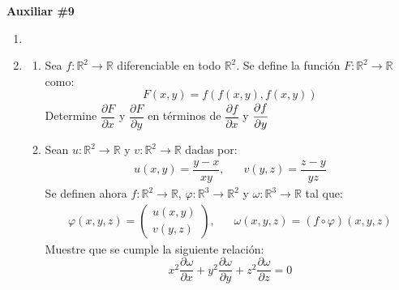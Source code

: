 \documentclass[letterpaper,11pt]{article}
\begin{document}
\begin{center}
	\LARGE \bf{Auxiliar \#9 }\\
\end{center}

\vspace{-1cm}
\begin{enumerate}\setlength{\itemsep}{0.4cm}	
\item[]

\item 
\begin{enumerate}
    \item Sea $f:\mathbb{R}^2\rightarrow \mathbb{R}$ diferenciable en todo $\mathbb{R}^2$. Se define la función $F:\mathbb{R}^2\rightarrow \mathbb{R}$ como:
    \[F(x,y)=f(f(x,y),f(x,y))\]
    Determine $\dfrac{\partial F}{\partial x}$ y $\dfrac{\partial F}{\partial y}$ en términos de $\dfrac{\partial f}{\partial x}$ y $\cfrac{\partial f}{\partial y}$
    
    \item Sean $u:\mathbb{R}^2\rightarrow\mathbb{R}$ y $v:\mathbb{R}^2\rightarrow\mathbb{R}$ dadas por:
    \begin{align*}
        u(x,y)=\dfrac{y-x}{xy}\text{,} & \quad v(y,z)=\dfrac{z-y}{yz}
    \end{align*}
    Se definen ahora $f: \mathbb{R}^2\rightarrow \mathbb{R}$, $\varphi:\mathbb{R}^3\rightarrow\mathbb{R}^2$ y $\omega:\mathbb{R}^3\rightarrow\mathbb{R}$ tal que:
    \begin{align*}
        \varphi(x,y,z)=\begin{pmatrix}
        u(x,y)\\
        v(y,z)
        \end{pmatrix} \text{,}& \quad \omega(x,y,z)=(f\circ\varphi)(x,y,z)
    \end{align*}
    Muestre que se cumple la siguiente relación:
    \[x^2\dfrac{\partial\omega}{\partial x}+y^2\dfrac{\partial\omega}{\partial y}+z^2\dfrac{\partial\omega}{\partial z}=0\]
\end{enumerate}


\end{enumerate}
\end{document}

